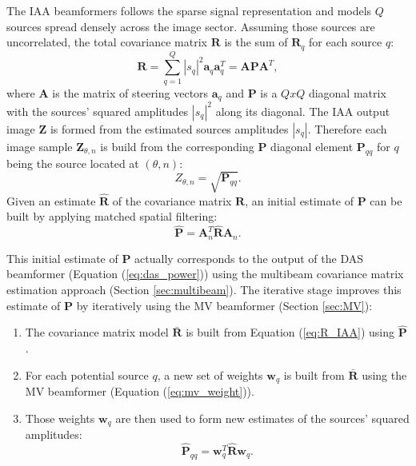 \noindent
The IAA beamformers follows the sparse signal representation and models $Q$ sources spread densely across the image sector. Assuming those sources are uncorrelated, the total covariance matrix $\boldsymbol{R}$ is the sum of $\boldsymbol{R}_q$ for each source $q$:
\begin{equation}
    \boldsymbol{R} = \sum_{q=1}^{Q} |s_q|^2 \boldsymbol{a}_q \boldsymbol{a}_q^T = \boldsymbol{A} \boldsymbol{P} \boldsymbol{A}^T,
\label{eq:R_IAA}
\end{equation}
\noindent
where $\boldsymbol{A}$ is the matrix of steering vectors $\boldsymbol{a}_q$ and $\boldsymbol{P}$ is a $Q x Q$ diagonal matrix with the sources' squared amplitudes $|s_q|^2$ along its diagonal.
The IAA output image $\boldsymbol{Z}$ is formed from the estimated sources amplitudes $|s_q|$. Therefore each image sample $\boldsymbol{Z}_{\theta,n}$ is build from the corresponding $\boldsymbol{P}$ diagonal element $\boldsymbol{P}_{qq}$ for $q$ being the source located at $(\theta,n)$:
\begin{equation}
    Z_{\theta,n} = \sqrt{\boldsymbol{P}_{qq}}.
\label{eq:IAA_output}
\end{equation}
\noindent
Given an estimate $\boldsymbol{\hat{R}}$ of the covariance matrix $\boldsymbol{R}$, an initial estimate of $\boldsymbol{P}$ can be built by applying matched spatial filtering:
\begin{equation}
    \boldsymbol{\hat{P}} = \boldsymbol{A}_n^T \boldsymbol{\hat{R}} \boldsymbol{A}_n.
\end{equation}

\noindent
This initial estimate of $\boldsymbol{P}$ actually corresponds to the output of the DAS beamformer (Equation (\ref{eq:das_power})) using the multibeam covariance matrix estimation approach (Section \ref{sec:multibeam}).
The iterative stage improves this estimate of $\boldsymbol{P}$ by iteratively using the MV beamformer (Section \ref{sec:MV}):
\begin{enumerate}
    \item The covariance matrix model $\boldsymbol{\bar{R}}$ is built from Equation (\ref{eq:R_IAA}) using $\boldsymbol{\hat{P}}$.
    \item For each potential source $q$, a new set of weights $\boldsymbol{w}_q$ is built from $\boldsymbol{\bar{R}}$ using the MV beamformer (Equation (\ref{eq:mv_weight})).
    \item Those weights $\boldsymbol{w}_q$ are then used to form new estimates of the sources' squared amplitudes:
    \begin{equation}
        \boldsymbol{\hat{P}}_{qq} = \boldsymbol{w}_q^T \boldsymbol{\hat{R}} \boldsymbol{w}_q.
    \label{eq:mb_output}
    \end{equation}
\end{enumerate}

